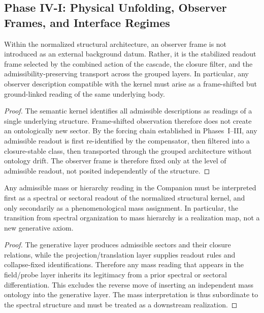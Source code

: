 \subsection*{Phase IV-I: Physical Unfolding, Observer Frames, and Interface Regimes}

\begin{lemma}
\label{lem:observer-frame-lemma}
Within the normalized structural architecture, an observer frame is not introduced as an external background datum. Rather, it is the stabilized readout frame selected by the combined action of the cascade, the closure filter, and the admissibility-preserving transport across the grouped layers. In particular, any observer description compatible with the kernel must arise as a frame-shifted but ground-linked reading of the same underlying body.
\end{lemma}

\begin{proof}
The semantic kernel identifies all admissible descriptions as readings of a single underlying structure. Frame-shifted observation therefore does not create an ontologically new sector. By the forcing chain established in Phases~I--III, any admissible readout is first re-identified by the compensator, then filtered into a closure-stable class, then transported through the grouped architecture without ontology drift. The observer frame is therefore fixed only at the level of admissible readout, not posited independently of the structure.
\end{proof}

\begin{lemma}
\label{lem:mass-spectral-reading-lemma}
Any admissible mass or hierarchy reading in the Companion must be interpreted first as a spectral or sectoral readout of the normalized structural kernel, and only secondarily as a phenomenological mass assignment. In particular, the transition from spectral organization to mass hierarchy is a realization map, not a new generative axiom.
\end{lemma}

\begin{proof}
The generative layer produces admissible sectors and their closure relations, while the projection/translation layer supplies readout rules and collapse-fixed identifications. Therefore any mass reading that appears in the field/probe layer inherits its legitimacy from a prior spectral or sectoral differentiation. This excludes the reverse move of inserting an independent mass ontology into the generative layer. The mass interpretation is thus subordinate to the spectral structure and must be treated as a downstream realization.
\end{proof}

